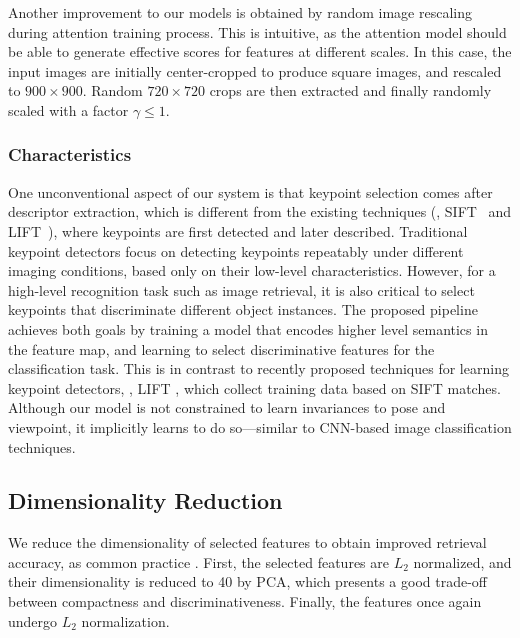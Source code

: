 \documentclass[10pt,twocolumn,letterpaper]{article}
\begin{document}
Another improvement to our models is obtained by random image rescaling during attention training process.
This is intuitive, as the attention model should be able to generate effective scores for features at different scales.
In this case, the input images are initially center-cropped to produce square images, and rescaled
to $900\times 900$.
Random $720\times 720$ crops are then extracted and finally randomly scaled with a factor $\gamma \leq 1$.


\subsubsection{Characteristics}

One unconventional aspect of our system is that keypoint selection comes after descriptor extraction, which is different from the existing techniques (\eg, SIFT~\cite{Lowe2004} and LIFT~\cite{yi2016lift}), where keypoints are first detected and later described.
Traditional keypoint detectors focus on detecting keypoints repeatably under different imaging conditions, based only on their low-level characteristics.
However, for a high-level recognition task such as image retrieval, it is also critical to select keypoints that discriminate different object instances.
The proposed pipeline achieves both goals by training a model that encodes higher level semantics in the feature map, and learning to select discriminative features for the classification task. 
This is in contrast to recently proposed techniques for learning keypoint detectors, \ie, LIFT \cite{yi2016lift}, which collect training data based on SIFT matches.
Although our model is not constrained to learn invariances to pose and viewpoint, it implicitly learns to do so---similar to CNN-based image classification techniques.













\subsection{Dimensionality Reduction}

We reduce the dimensionality of selected features to obtain improved retrieval accuracy,
as common practice \cite{jegou2012negative}.
First, the selected features are $L_2$ normalized, and their dimensionality is reduced to 40 by PCA, which presents a good trade-off between compactness and discriminativeness.
Finally, the features once again undergo $L_2$ normalization.
\end{document}
